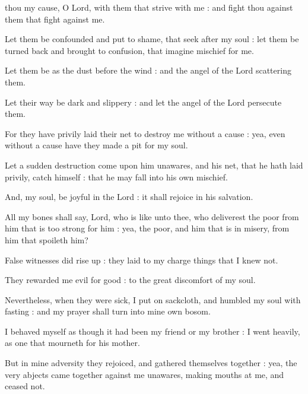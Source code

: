 

 thou my cause, O Lord, with them that strive with me : and fight thou against them that fight against me.\par
{}
Let them be confounded and put to shame, that seek after my soul : let them be turned back and brought to confusion, that imagine mischief for me.\par
{}Let them be as the dust before the wind : and the angel of the Lord scattering them.\par
{}Let their way be dark and slippery : and let the angel of the Lord persecute them.\par
{}For they have privily laid their net to destroy me without a cause : yea, even without a cause have they made a pit for my soul.\par
{}Let a sudden destruction come upon him unawares, and his net, that he hath laid privily, catch himself : that he may fall into his own mischief.\par
{}And, my soul, be joyful in the Lord : it shall rejoice in his salvation.\par
{}All my bones shall say, Lord, who is like unto thee, who deliverest the poor from him that is too strong for him : yea, the poor, and him that is in misery, from him that spoileth him?\par
{}False witnesses did rise up : they laid to my charge things that I knew not.\par
{}They rewarded me evil for good : to the great discomfort of my soul.\par
{}Nevertheless, when they were sick, I put on sackcloth, and humbled my soul with fasting : and my prayer shall turn into mine own bosom.\par
{}I behaved myself as though it had been my friend or my brother : I went heavily, as one that mourneth for his mother.\par
{}But in mine adversity they rejoiced, and gathered themselves together : yea, the very abjects came together against me unawares, making mouths at me, and ceased not.\par
